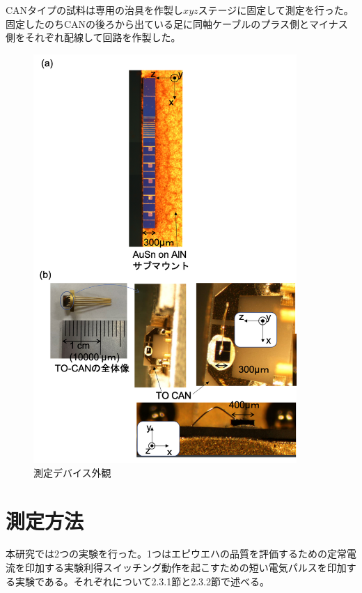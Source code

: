 CANタイプの試料は専用の治具を作製し$xyz$ステージに固定して測定を行った。固定したのちCANの後ろから出ている足に同軸ケーブルのプラス側とマイナス側をそれぞれ配線して回路を作製した。

\begin{figure}[h]%
	\centering
	\includegraphics[width=10cm]{figure/fig_2_1_mount.png}
	\caption{測定デバイス外観}
	\label{fig:fig_2_1_mount}
\end{figure}

\clearpage
\section{測定方法}%
本研究では2つの実験を行った。1つはエピウエハの品質を評価するための定常電流を印加する実験利得スイッチング動作を起こすための短い電気パルスを印加する実験である。それぞれについて2.3.1節と2.3.2節で述べる。
